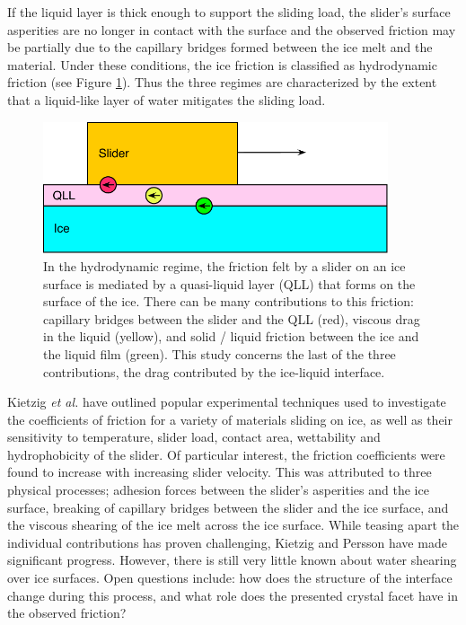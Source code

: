 If the liquid layer is thick enough to support the sliding load, the
slider's surface asperities are no longer in contact with the surface
and the observed friction may be partially due to the capillary
bridges formed between the ice melt and the material. Under these
conditions, the ice friction is classified as hydrodynamic friction
(see Figure \ref{fig:QLLsketch}).\cite{Kietzig2009,Kietzig2010} Thus
the three regimes are characterized by the extent that a liquid-like
layer of water mitigates the sliding load.

\begin{figure}
\includegraphics[width=4in]{Figures/QLLsketch}
\caption{\label{fig:QLLsketch} In the hydrodynamic regime, the
  friction felt by a slider on an ice surface is mediated by a
  quasi-liquid layer (QLL) that forms on the surface of the ice.
  There can be many contributions to this friction: capillary bridges
  between the slider and the QLL (red), viscous drag in the liquid
  (yellow), and solid / liquid friction between the ice and the liquid
  film (green). This study concerns the last of the three
  contributions, the drag contributed by the ice-liquid interface.}
\end{figure}

Kietzig \textit{et al.} have outlined popular experimental techniques
used to investigate the coefficients of friction for a variety of
materials sliding on ice, as well as their sensitivity to temperature,
slider load, contact area, wettability and hydrophobicity of the
slider.\cite{Kietzig2010} Of particular interest, the friction
coefficients were found to increase with increasing slider
velocity. This was attributed to three physical processes; adhesion
forces between the slider's asperities and the ice surface, breaking
of capillary bridges between the slider and the ice surface, and the
viscous shearing of the ice melt across the ice surface. While teasing
apart the individual contributions has proven challenging,
Kietzig\cite{Kietzig2009} and Persson\cite{Persson2015,Tuononen2016}
have made significant progress. However, there is still very little
known about water shearing over ice surfaces. Open questions include:
how does the structure of the interface change during this process,
and what role does the presented crystal facet have in the observed
friction?

